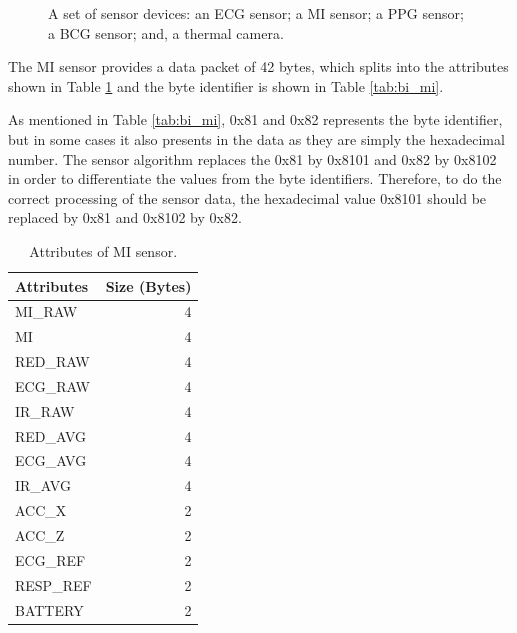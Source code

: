 \begin{figure}
	\hspace{8pt}%
	\caption[A set of sensor devices.]{A set of sensor devices:
		 an ECG sensor;
		 a MI sensor;
		 a PPG sensor;
		 a BCG sensor; and,
		 a thermal camera.}%
	\label{fig:ex3}%
\end{figure}



The MI sensor provides a data packet of 42 bytes, which splits into the attributes shown in Table \ref{tab:att_mi} and the byte identifier is shown in Table \ref{tab:bi_mi}.


As mentioned in Table \ref{tab:bi_mi}, 0x81 and 0x82 represents the byte identifier, but in some cases it also presents in the data as they are simply the hexadecimal number. The sensor algorithm replaces the 0x81 by 0x8101 and 0x82 by 0x8102 in order to differentiate the values from the byte identifiers. Therefore, to do the correct processing of the sensor data, the hexadecimal value 0x8101 should be replaced by 0x81 and 0x8102 by 0x82.

\renewcommand{\arraystretch}{2}
\begin{table}
	\caption{Attributes of MI sensor.} \label{tab:att_mi}
	
	\begin{center}
		\begin{tabular}{ | l | r | }
			\hline
			\textbf{Attributes} & \textbf{Size (Bytes)} \\ \hline
			MI\_RAW  & 4 \\ \hline
			MI  & 4  \\ \hline
			RED\_RAW  & 4  \\ \hline
			ECG\_RAW  & 4  \\ \hline
			IR\_RAW  & 4  \\ \hline
			RED\_AVG  & 4  \\ \hline
			ECG\_AVG  & 4  \\ \hline
			IR\_AVG  & 4  \\ \hline
			ACC\_X  & 2  \\ \hline
			ACC\_Z  & 2  \\ \hline
			ECG\_REF  & 2  \\ \hline
			RESP\_REF  & 2  \\ \hline
			BATTERY  & 2  \\ \hline
		\end{tabular}
	\end{center}
	
\end{table}


